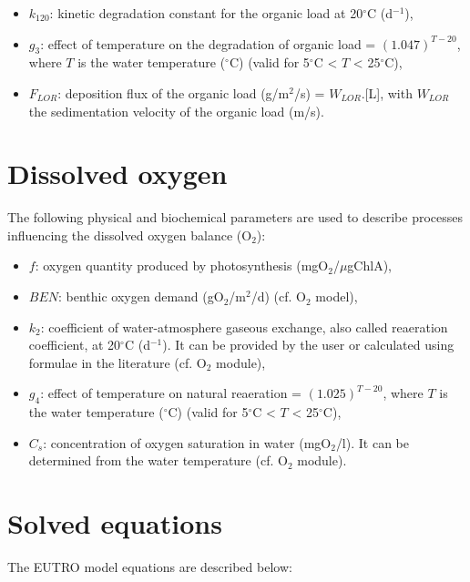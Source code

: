 \begin{itemize}
\item $k_{120}$: kinetic degradation constant for the organic load at 20$^{\circ}$C (d$^{-1}$),
\item $g_3$: effect of temperature on the degradation of organic load = $(1.047)^{T-20}$,
  where $T$ is the water temperature ($^{\circ}$C) (valid for 5$^{\circ}$C < $T$ < 25$^{\circ}$C),
\item $F_{LOR}$: deposition flux of the organic load (g/m$^2$/s) = $W_{LOR}$.[L],
  with $W_{LOR}$ the sedimentation velocity of the organic load (m/s).
\end{itemize}

\section{Dissolved oxygen}

The following physical and biochemical parameters are used to describe processes
influencing the dissolved oxygen balance (O$_2$):

\begin{itemize}
\item $f$: oxygen quantity produced by photosynthesis (mgO$_2$/$\mu$gChlA),
\item $BEN$: benthic oxygen demand (gO$_2$/m$^2$/d) (cf. O$_2$ model),
\item $k_2$: coefficient of water-atmosphere gaseous exchange,
  also called reaeration coefficient, at 20$^{\circ}$C (d$^{-1}$).
  It can be provided by the user or calculated using formulae in the literature (cf. O$_2$ module),
\item $g_4$: effect of temperature on natural reaeration = $(1.025)^{T-20}$,
  where $T$ is the water temperature ($^{\circ}$C) (valid for 5$^{\circ}$C < $T$ < 25$^{\circ}$C),
\item $C_s$: concentration of oxygen saturation in water (mgO$_2$/l).
  It can be determined from the water temperature (cf. O$_2$ module).
\end{itemize}

\section{Solved equations}

The EUTRO model equations are described below:\\

